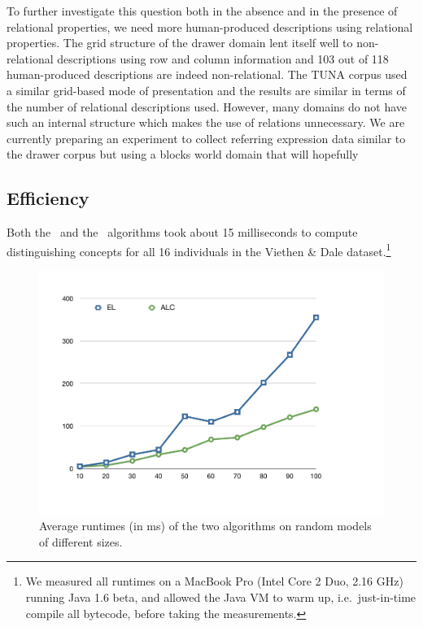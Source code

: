 To further investigate this question both in the absence and in the
presence of relational properties, we need more human-produced
descriptions using relational properties. The grid structure of the
drawer domain lent itself well to non-relational descriptions using
row and column information and 103 out of 118 human-produced
descriptions are indeed non-relational. The TUNA corpus
\cite{deemter06:_build_seman_trans_corpus_for} used a similar
grid-based mode of presentation and the results are similar in terms
of the number of relational descriptions used. However, many domains
do not have such an internal structure which makes the use of
relations unnecessary. We are currently preparing an experiment to
collect referring expression data similar to the drawer corpus but
using a blocks world domain that will hopefully






\subsection{Efficiency}

Both the \el\ and the \alc\ algorithms took about 15 milliseconds to
compute distinguishing concepts for all 16 individuals in the Viethen
\& Dale dataset.\footnote{We measured all runtimes on a MacBook Pro
  (Intel Core 2 Duo, 2.16 GHz) running Java 1.6 beta, and allowed the
  Java VM to warm up, i.e.\ just-in-time compile all bytecode, before
  taking the measurements.}

\begin{figure}[thb]
  \centering
  \includegraphics[width=\columnwidth]{runtimes}
  \caption{Average runtimes (in ms) of the two algorithms on random
    models of     different sizes.} 
  \label{fig:runtimes}
\end{figure}

